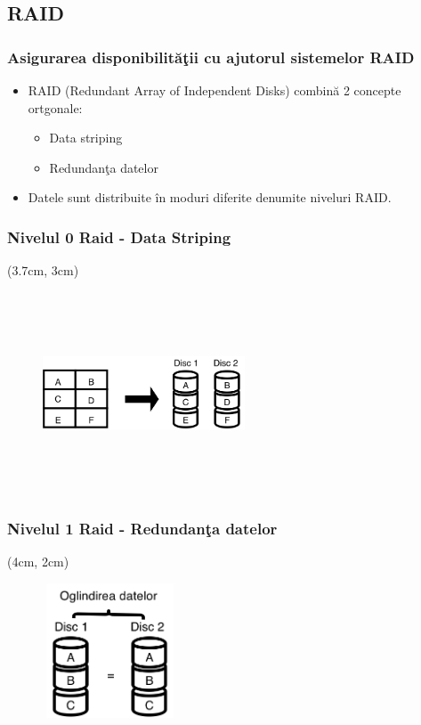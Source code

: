 \documentclass{beamer}
\theoremstyle{definition}
\begin{document}
\subsection{RAID}
\begin{frame}
    \frametitle{Asigurarea disponibilit\u{a}\c{t}ii cu ajutorul sistemelor RAID}
    \begin{itemize}
        \item RAID (Redundant Array of Independent Disks) combin\u{a} 2 concepte ortgonale:
        \pause
            \begin{itemize}
                \item Data striping
                \pause
                \item Redundan\c{t}a datelor 
            \end{itemize}
        \pause
        \item Datele sunt distribuite \^{i}n moduri diferite denumite niveluri RAID.
    \end{itemize}
\end{frame}
\begin{frame}
    \frametitle{Nivelul 0 Raid - Data Striping}
    \begin{textblock*}{4cm}(3.7cm, 3cm)
        \begin{figure}
            \includegraphics[width=6cm,height=6cm,keepaspectratio]{img/raid/raid0.png}
       \end{figure}
    \end{textblock*}  
\end{frame}

\begin{frame}
    \frametitle{Nivelul 1 Raid - Redundan\c{t}a datelor}
    \begin{textblock*}{4cm}(4cm, 2cm)
        \begin{figure}
            \includegraphics[width=4cm,height=4cm,keepaspectratio]{img/raid/raid1.png}

            \caption{}
       \end{figure}
    \end{textblock*}  
\end{frame}
\end{document}
